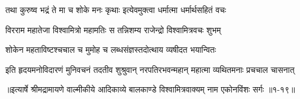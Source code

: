 \twolineshloka
{तथा कुरुष्व भद्रं ते मा च शोके मनः कृथाः}
{इत्येवमुक्त्वा धर्मात्मा धर्मार्थसहितं वचः} %

\twolineshloka
{विरराम महातेजा विश्वामित्रो महामतिः}
{स तन्निशम्य राजेन्द्रो विश्वामित्रवचः शुभम्} %

\twolineshloka
{शोकेन महताविष्टश्चचाल च मुमोह च}
{लब्धसंज्ञस्तदोत्थाय व्यषीदत भयान्वितः} %

\twolineshloka
{इति हृदयमनोविदारणं मुनिवचनं तदतीव शुश्रुवान्}
{नरपतिरभवन्महान् महात्मा व्यथितमनाः प्रचचाल चासनात्} %


॥इत्यार्षे श्रीमद्रामायणे वाल्मीकीये आदिकाव्ये बालकाण्डे विश्वामित्रवाक्यम् नाम एकोनविंशः सर्गः ॥१-१९॥
